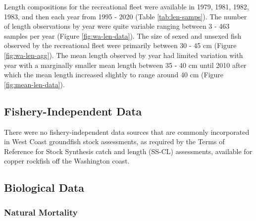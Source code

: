 \documentclass[11pt,
  english,
  a4paper,
]{article}
\begin{document}
\leavevmode\tagmcend\tagstructend\par


Length compositions for the recreational fleet were available in 1979, 1981, 1982, 1983, and then each year from 1995 - 2020 (Table \ref{tab:len-samps}). The number of length observations by year were quite variable ranging between 3 - 463 samples per year (Figure \ref{fig:wa-len-data}). The size of sexed and unsexed fish observed by the recreational fleet were primarily between 30 - 45 cm (Figure \ref{fig:wa-len-agg}). The mean length observed by year had limited variation with year with a marginally smaller mean length between 35 - 40 cm until 2010 after which the mean length increased slightly to range around 40 cm (Figure \ref{fig:mean-len-data}).

\leavevmode\tagmcend\tagstructend\par


\hypertarget{fishery-independent-data}{%
\subsection{Fishery-Independent Data}\label{fishery-independent-data}}

\leavevmode\tagmcend\tagstructend


There were no fishery-independent data sources that are commonly incorporated in West Coast groundfish stock assessments, as required by the Terms of Reference for Stock Synthesis catch and length (SS-CL) assessments, available for copper rockfish off the Washington coast.

\leavevmode\tagmcend\tagstructend\par


\hypertarget{biological-data}{%
\subsection{Biological Data}\label{biological-data}}

\leavevmode\tagmcend\tagstructend


\hypertarget{natural-mortality}{%
\subsubsection{Natural Mortality}\label{natural-mortality}}
\end{document}
